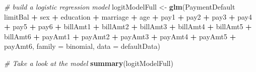 \documentclass[
]{article}
\newenvironment{Shaded}{\begin{snugshade}}{\end{snugshade}}
\newcommand{\CommentTok}[1]{\textcolor[rgb]{0.56,0.35,0.01}{\textit{#1}}}
\newcommand{\DataTypeTok}[1]{\textcolor[rgb]{0.13,0.29,0.53}{#1}}
\newcommand{\KeywordTok}[1]{\textcolor[rgb]{0.13,0.29,0.53}{\textbf{#1}}}
\newcommand{\NormalTok}[1]{#1}
\newcommand{\OperatorTok}[1]{\textcolor[rgb]{0.81,0.36,0.00}{\textbf{#1}}}
\newcommand{\StringTok}[1]{\textcolor[rgb]{0.31,0.60,0.02}{#1}}
\begin{document}
\begin{Shaded}
\begin{Highlighting}[]
\CommentTok{# build a logistic regression model}
\NormalTok{logitModelFull <-}\StringTok{ }\KeywordTok{glm}\NormalTok{(PaymentDefault }\OperatorTok{~}\StringTok{ }\NormalTok{limitBal }\OperatorTok{+}\StringTok{ }\NormalTok{sex }\OperatorTok{+}\StringTok{ }\NormalTok{education }\OperatorTok{+}\StringTok{ }\NormalTok{marriage }\OperatorTok{+}
\StringTok{                   }\NormalTok{age }\OperatorTok{+}\StringTok{ }\NormalTok{pay1 }\OperatorTok{+}\StringTok{ }\NormalTok{pay2 }\OperatorTok{+}\StringTok{ }\NormalTok{pay3 }\OperatorTok{+}\StringTok{ }\NormalTok{pay4 }\OperatorTok{+}\StringTok{ }\NormalTok{pay5 }\OperatorTok{+}\StringTok{ }\NormalTok{pay6 }\OperatorTok{+}\StringTok{ }\NormalTok{billAmt1 }\OperatorTok{+}\StringTok{ }
\StringTok{                   }\NormalTok{billAmt2 }\OperatorTok{+}\StringTok{ }\NormalTok{billAmt3 }\OperatorTok{+}\StringTok{ }\NormalTok{billAmt4 }\OperatorTok{+}\StringTok{ }\NormalTok{billAmt5 }\OperatorTok{+}\StringTok{ }\NormalTok{billAmt6 }\OperatorTok{+}\StringTok{ }\NormalTok{payAmt1 }\OperatorTok{+}\StringTok{ }
\StringTok{                   }\NormalTok{payAmt2 }\OperatorTok{+}\StringTok{ }\NormalTok{payAmt3 }\OperatorTok{+}\StringTok{ }\NormalTok{payAmt4 }\OperatorTok{+}\StringTok{ }\NormalTok{payAmt5 }\OperatorTok{+}\StringTok{ }\NormalTok{payAmt6, }
                 \DataTypeTok{family =}\NormalTok{ binomial, }\DataTypeTok{data =}\NormalTok{ defaultData)}

\CommentTok{# Take a look at the model}
\KeywordTok{summary}\NormalTok{(logitModelFull)}
\end{Highlighting}
\end{Shaded}
\end{document}
